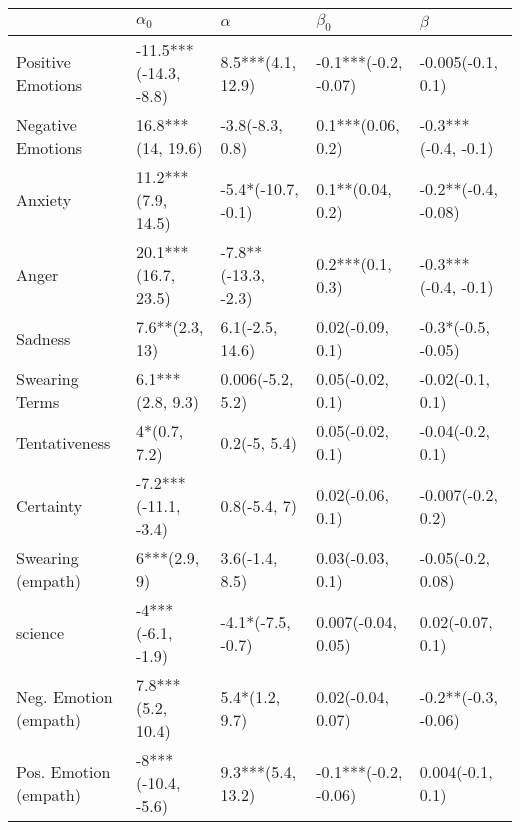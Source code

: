 \begin{tabular}{lllll}
\toprule
{} &             $\alpha_0$ &             $\alpha$ &             $\beta_0$ &              $\beta$ \\
\midrule
Positive Emotions     &  -11.5***(-14.3, -8.8) &    8.5***(4.1, 12.9) &  -0.1***(-0.2, -0.07) &    -0.005(-0.1, 0.1) \\
Negative Emotions     &      16.8***(14, 19.6) &      -3.8(-8.3, 0.8) &     0.1***(0.06, 0.2) &  -0.3***(-0.4, -0.1) \\
Anxiety               &     11.2***(7.9, 14.5) &   -5.4*(-10.7, -0.1) &      0.1**(0.04, 0.2) &  -0.2**(-0.4, -0.08) \\
Anger                 &    20.1***(16.7, 23.5) &  -7.8**(-13.3, -2.3) &      0.2***(0.1, 0.3) &  -0.3***(-0.4, -0.1) \\
Sadness               &         7.6**(2.3, 13) &      6.1(-2.5, 14.6) &      0.02(-0.09, 0.1) &   -0.3*(-0.5, -0.05) \\
Swearing Terms        &       6.1***(2.8, 9.3) &     0.006(-5.2, 5.2) &      0.05(-0.02, 0.1) &     -0.02(-0.1, 0.1) \\
Tentativeness         &           4*(0.7, 7.2) &         0.2(-5, 5.4) &      0.05(-0.02, 0.1) &     -0.04(-0.2, 0.1) \\
Certainty             &   -7.2***(-11.1, -3.4) &         0.8(-5.4, 7) &      0.02(-0.06, 0.1) &    -0.007(-0.2, 0.2) \\
Swearing (empath)     &           6***(2.9, 9) &       3.6(-1.4, 8.5) &      0.03(-0.03, 0.1) &    -0.05(-0.2, 0.08) \\
science               &      -4***(-6.1, -1.9) &    -4.1*(-7.5, -0.7) &    0.007(-0.04, 0.05) &     0.02(-0.07, 0.1) \\
Neg. Emotion (empath) &      7.8***(5.2, 10.4) &       5.4*(1.2, 9.7) &     0.02(-0.04, 0.07) &  -0.2**(-0.3, -0.06) \\
Pos. Emotion (empath) &     -8***(-10.4, -5.6) &    9.3***(5.4, 13.2) &  -0.1***(-0.2, -0.06) &     0.004(-0.1, 0.1) \\
\bottomrule
\end{tabular}
